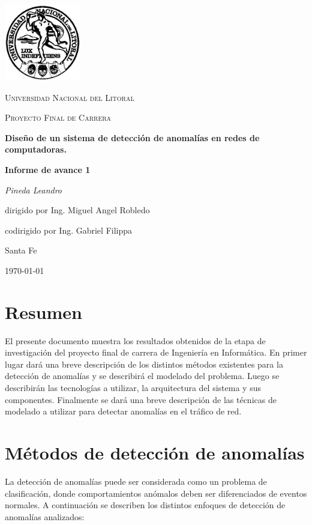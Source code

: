 \documentclass[a4paper,10pt, oneside]{article}
\begin{document}
	
\begin{titlepage}
	\centering
	\includegraphics[width=0.25\textwidth]{../../Universidad_del_Litoral}\par\vspace{1cm}
	{\scshape\LARGE Universidad Nacional del Litoral \par}
	\vspace{1cm}
	{\scshape\Large Proyecto Final de Carrera\par}
	\vspace{1.5cm}
	{\huge\bfseries Diseño de un sistema de detección de anomalías en redes de computadoras.\par}
	\vspace{1.5cm}
	{\huge\bfseries Informe de avance 1\par}
	\vspace{2cm}
	{\Large\itshape Pineda Leandro\par}
	\vfill
	dirigido por Ing. Miguel Angel Robledo\par
	codirigido por Ing. Gabriel Filippa
	
	\vfill
	
	\large Santa Fe\par
	{\large \today\par}	
\end{titlepage}

\modulolinenumbers[5]
\linenumbers


\section{Resumen}
El presente documento muestra los resultados obtenidos de la etapa de investigación del proyecto final de carrera de Ingeniería en Informática. En primer lugar dará una breve descripción de los distintos métodos existentes para la detección de anomalías  y se describirá el modelado del problema. Luego se describirán las tecnologías a utilizar, la arquitectura del sistema y sus componentes. Finalmente se dará una breve descripción de las técnicas de modelado a utilizar para detectar anomalías en el tráfico de red.

\section{Métodos de detección de anomalías}
La detección de anomalías puede ser considerada como un problema de clasificación, donde comportamientos anómalos deben ser diferenciados de eventos normales\cite{baddar2014anomaly}. A continuación se describen los distintos enfoques de detección de anomalías analizados:
\end{document}
